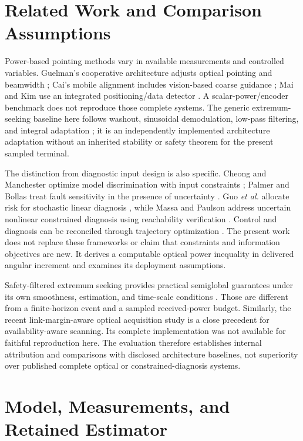 \documentclass[10pt,journal]{IEEEtran}
\begin{document}
\section{Related Work and Comparison Assumptions}
Power-based pointing methods vary in available measurements and controlled variables. Guelman's cooperative architecture adjusts optical pointing and beamwidth \cite{guelman}; Cai's mobile alignment includes vision-based coarse guidance \cite{cai}; Mai and Kim use an integrated positioning/data detector \cite{mai}. A scalar-power/encoder benchmark does not reproduce those complete systems. The generic extremum-seeking baseline here follows washout, sinusoidal demodulation, low-pass filtering, and integral adaptation \cite{es}; it is an independently implemented architecture adaptation without an inherited stability or safety theorem for the present sampled terminal.

The distinction from diagnostic input design is also specific. Cheong and Manchester optimize model discrimination with input constraints \cite{cheong}; Palmer and Bollas treat fault sensitivity in the presence of uncertainty \cite{palmer}. Guo \emph{et al.} allocate risk for stochastic linear diagnosis \cite{guo}, while Massa and Paulson address uncertain nonlinear constrained diagnosis using reachability verification \cite{massa}. Control and diagnosis can be reconciled through trajectory optimization \cite{cao}. The present work does not replace these frameworks or claim that constraints and information objectives are new. It derives a computable optical power inequality in delivered angular increment and examines its deployment assumptions.

Safety-filtered extremum seeking provides practical semiglobal guarantees under its own smoothness, estimation, and time-scale conditions \cite{safees}. Those are different from a finite-horizon event and a sampled received-power budget. Similarly, the recent link-margin-aware optical acquisition study \cite{yan} is a close precedent for availability-aware scanning. Its complete implementation was not available for faithful reproduction here. The evaluation therefore establishes internal attribution and comparisons with disclosed architecture baselines, not superiority over published complete optical or constrained-diagnosis systems.



\section{Model, Measurements, and Retained Estimator}
\end{document}
